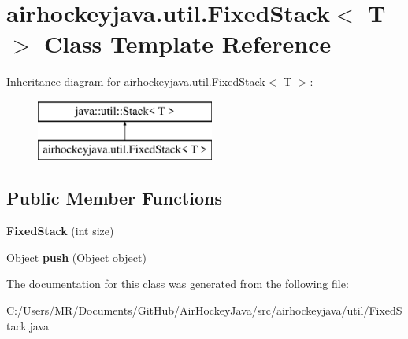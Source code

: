 \hypertarget{classairhockeyjava_1_1util_1_1_fixed_stack}{}\section{airhockeyjava.\+util.\+Fixed\+Stack$<$ T $>$ Class Template Reference}
\label{classairhockeyjava_1_1util_1_1_fixed_stack}
Inheritance diagram for airhockeyjava.\+util.\+Fixed\+Stack$<$ T $>$\+:\begin{figure}[H]
\begin{center}
\leavevmode
\includegraphics[height=2.000000cm]{classairhockeyjava_1_1util_1_1_fixed_stack}
\end{center}
\end{figure}
\subsection*{Public Member Functions}
\begin{DoxyCompactItemize}
\item 
\hypertarget{classairhockeyjava_1_1util_1_1_fixed_stack_a03b1d4eb26b000c193a42ded1eff1ab4}{}{\bfseries Fixed\+Stack} (int size)\label{classairhockeyjava_1_1util_1_1_fixed_stack_a03b1d4eb26b000c193a42ded1eff1ab4}

\item 
\hypertarget{classairhockeyjava_1_1util_1_1_fixed_stack_a2b45bcb518b456013962e1231f2bed16}{}Object {\bfseries push} (Object object)\label{classairhockeyjava_1_1util_1_1_fixed_stack_a2b45bcb518b456013962e1231f2bed16}

\end{DoxyCompactItemize}


The documentation for this class was generated from the following file\+:\begin{DoxyCompactItemize}
\item 
C\+:/\+Users/\+M\+R/\+Documents/\+Git\+Hub/\+Air\+Hockey\+Java/src/airhockeyjava/util/Fixed\+Stack.\+java\end{DoxyCompactItemize}
